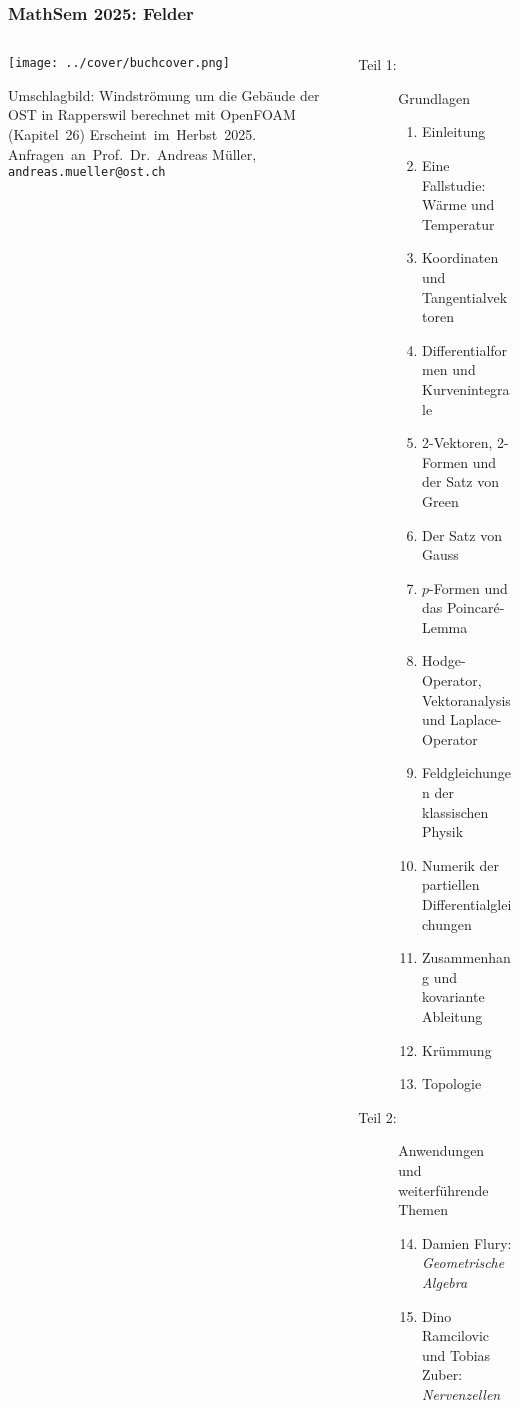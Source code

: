 \documentclass[handout]{beamer}
\title[]{}
\begin{document}
\begin{frame}
\frametitle{%
MathSem 2025: Felder}
\vspace*{-0.1cm}
\begin{columns}[t,onlytextwidth]
\begin{column}{0.37\textwidth}
\begin{center}
\texttt{[image: ../cover/buchcover.png]}
\end{center}
\bigskip
Umschlagbild: Windströmung um die Gebäude der OST in Rapperswil
berechnet mit OpenFOAM (Kapitel~26)
\bigskip
\bigskip
Erscheint~im~Herbst~2025.\\
Anfragen~an~Prof.~Dr.~Andreas Müller,\\
{\texttt{andreas.mueller@ost.ch}}
\bigskip
\bigskip
\bigskip
\end{column}
%
\begin{column}{0.60\textwidth}
\begin{description}
\item[Teil 1:] Grundlagen
\begin{enumerate}
\item Einleitung
\item Eine Fallstudie: Wärme und Temperatur
\item Koordinaten und Tangentialvektoren
\item Differentialformen und Kurvenintegrale
\item 2-Vektoren, 2-Formen und der Satz von Green
\item Der Satz von Gauss
\item $p$-Formen und das Poincaré-Lemma
\item Hodge-Operator, Vektoranalysis und Laplace-Operator
\item Feldgleichungen der klassischen Physik
\item Numerik der partiellen Differentialgleichungen
\item Zusammenhang und kovariante Ableitung
\item Krümmung
\item Topologie
\end{enumerate}
\item[Teil 2:] Anwendungen und weiterführende Themen
\begin{enumerate}
\setcounter{enumi}{13}
\item Damien Flury: {\em Geometrische Algebra}
\item Dino Ramcilovic und Tobias Zuber: {\em Nervenzellen}

\end{enumerate}
\end{description}
\end{column}
\end{columns}
\end{frame}
\end{document}

